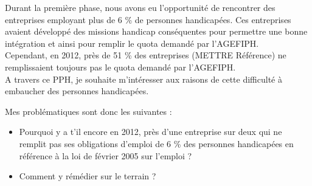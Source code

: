 Durant la première phase, nous avons eu l'opportunité de rencontrer des entreprises employant plus de 6 \% de personnes handicapées. Ces entreprises avaient développé des missions handicap conséquentes pour permettre une bonne intégration et ainsi pour remplir le quota demandé par l'AGEFIPH.\\

Cependant, en 2012, près de 51 \% des entreprises (METTRE Référence) ne remplissaient toujours pas le quota demandé par l'AGEFIPH.\\
A travers ce PPH, je souhaite m'intéresser aux raisons de cette difficulté à embaucher des personnes handicapées.

Mes problématiques sont donc les suivantes :
\begin{itemize}
\item Pourquoi y a t'il encore en 2012, près d'une entreprise sur deux qui ne remplit pas ses obligations d'emploi de 6 \% des personnes handicapées en référence à la loi de février 2005 sur l'emploi ? \\
\item Comment y rémédier sur le terrain ?
\end{itemize}

